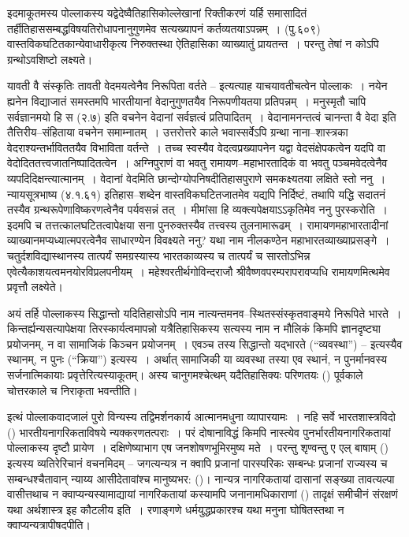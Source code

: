 इदमाकूतमस्य पोल्लाकस्य यद्वेदेष्वैतिहासिकोल्लेखानां रिक्तीकरणं यर्हि समासादितं तर्हीतिहाससम्बद्धविषयतिरोधापनानुगुणमेव सत्यख्यापनं कर्तव्यतयाऽपन्नम्~। (पु.६०९) वास्तविकघटितकान्येवाधारीकृत्य निरुक्तस्था ऐतिहासिका व्याख्यातुं प्रायतन्त~। परन्तु तेषां न कोऽपि ग्रन्थोऽवशिष्टो लक्ष्यते।

यावती वै संस्कृतिः तावती वेदमयत्वेनैव निरूपिता वर्तते – इत्यत्याह याचयावतीचत्वेन पोल्लाकः~। नयेन ह्यनेन विद्याजातं समस्तमपि भारतीयानां वेदानुगुणतयैव निरूपणीयतया प्रतिपन्नम्~। मनुस्मृतौ चापि सर्वज्ञानमयो हि स (२.७) इति वचनेन वेदानां सर्वज्ञत्वं प्रतिपादितम्~। वेदानामनन्तत्वं चानन्ता वै वेदा इति तैत्तिरीय–संहिताया वचनेन समाम्नातम्~। उत्तरोत्तरे काले भवास्सर्वेऽपि ग्रन्था नाना–शास्त्रका वेदराश्यन्तर्भाविततयैव विभाविता वर्तन्ते~। तच्च स्वस्यैव वेदत्वप्रख्यापनेन यद्वा वेदसंक्षेपकत्वेन यदपि वा वेदोदिततत्त्वजातनिष्पादितत्वेन~। अग्निपुराणं वा भवतु रामायण–महाभारतादिकं वा भवतु पञ्चमवेदत्वेनैव व्यपदिदिक्षन्त्यात्मानम्~। वेदानां वेदमिति छान्दोग्योपनिषदीतिहासपुराणे समकक्ष्यतया लक्षिते स्तो ननु~। न्यायसूत्रभाष्य (४.१.६१) इतिहास–शब्देन वास्तविकघटितजातमेव यद्यपि निर्दिष्टं, तथापि यद्धि सदातनं तस्यैव ग्रन्थरूपेणाविष्करणत्वेनैव पर्यवसन्नं तत्~। मीमांसा हि व्यक्त्यपेक्षयाऽऽकृतिमेव ननु पुरस्करोति~। इदमपि च तत्तत्कालघटितत्वापेक्षया सना पुनरुक्तस्यैव तत्त्वस्य तुलनामारूढम्~। रामायणमहाभारतादीनां व्याख्यानमप्यध्यात्मपरत्वेनैव साधारण्येन विवक्ष्यते ननु? यथा नाम नीलकण्ठेन महाभारतव्याख्याप्रसङ्गे~। चतुर्दशविद्यास्थानस्य तात्पर्यं समग्रस्यास्य भारतकाव्यस्य च तात्पर्यं च सारतोऽभिन्न एवेत्यैकाशयत्वमनयोरविप्रलपनीयम्~। महेश्वरतीर्थगोविन्दराजौ श्रीवैष्णवपरम्परापरावप्यधि रामायणमित्थमेव प्रवृत्तौ लक्ष्येते।

अयं तर्हि पोल्लाकस्य सिद्धान्तो यदितिहासोऽपि नाम नात्यन्तमनव–स्थितस्संस्कृतवाङ्मये निरूपिते भारते~। किन्तर्ह्यन्यसत्यापेक्षया तिरस्कार्यत्वमापन्नो यत्रैतिहासिकस्य सत्यस्य नाम न मौलिकं किमपि ज्ञानदृष्ट्या प्रयोजनम्, न वा सामाजिकं किञ्चन प्रयोजनम्~। एवञ्च तस्य सिद्धान्तो यद्भारते  (“व्यवस्था”) – इत्यस्यैव स्थानम्, न पुनः  (“क्रिया”) इत्यस्य~। अर्थात् सामाजिकी या व्यवस्था तस्या एव स्थानं, न पुनर्मानवस्य सर्जनात्मिकायाः प्रवृत्तेरित्यस्याकूतम्। अस्य चानुगमश्चेत्थम् यदैतिहासिक्यः परिणतयः () पूर्वकाले चोत्तरकाले च निराकृता भवन्तीति।

इत्थं पोल्लाकवादजालं पुरो विन्यस्य तद्विमर्शनकार्य आत्मानमधुना व्यापारयामः~। नहि सर्वे भारतशास्त्रविदो () भारतीयनागरिकताविषये न्यक्करणतत्पराः~। परं दोषानाविद्धं किमपि नास्त्येव पुनर्भारतीयनागरिकतायां पोल्लाकस्य दृष्टौ प्रायेण~। दक्षिणेष्याभाग एष जनशोषणभूमिरमुष्य मते~। परन्तु शृण्वन्तु ए एल् बाषाम् () इत्यस्य व्यतिरेरिचानं वचनमिदम् – जगत्यन्यत्र न क्वापि प्रजानां पारस्परिकः सम्बन्धः प्रजानां राज्यस्य च सम्बन्धश्चैतावान् न्याय्य आसीदेतावांश्च मानुष्यभर: ()। नान्यत्र नागरिकतायां दासानां सङ्ख्या तावत्यल्पा वासीत्तथाच न क्वाप्यन्यस्यामाद्यायां नागरिकतायां कस्यामपि जनानामधिकाराणां () तादृक्षं समीचीनं संरक्षणं यथा अर्थशास्त्र इह कौटलीय इति~। रणाङ्गणे धर्मयुद्धप्रकारश्च यथा मनुना घोषितस्तथा न क्वाप्यन्यत्रापीषदपीति।

